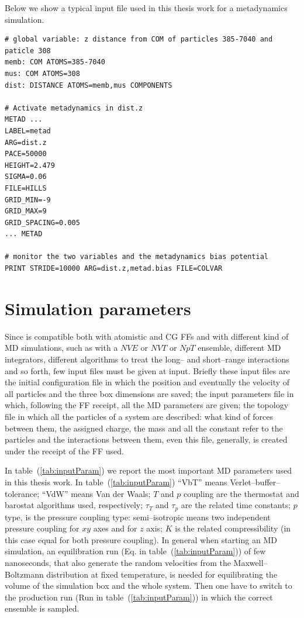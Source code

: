 Below we show a typical input file used in this thesis work for a metadynamics simulation.
\begin{Verbatim}[fontsize=\scriptsize,xleftmargin=1cm]
# global variable: z distance from COM of particles 385-7040 and paticle 308 
memb: COM ATOMS=385-7040
mus: COM ATOMS=308
dist: DISTANCE ATOMS=memb,mus COMPONENTS

# Activate metadynamics in dist.z
METAD ...
LABEL=metad
ARG=dist.z 
PACE=50000
HEIGHT=2.479
SIGMA=0.06
FILE=HILLS
GRID_MIN=-9
GRID_MAX=9
GRID_SPACING=0.005
... METAD

# monitor the two variables and the metadynamics bias potential
PRINT STRIDE=10000 ARG=dist.z,metad.bias FILE=COLVAR
\end{Verbatim}

\section{Simulation parameters}
Since \gromacs is compatible both with atomistic and \ac{CG} \acp{FF} and with different kind of \ac{MD} simulations, such as with a $NVE$ or $NVT$ or $NpT$ ensemble, different \ac{MD} integrators, different algorithms to treat the long-- and short--range interactions and so forth, few input files must be given at \gromacs input. Briefly these input files are the initial configuration file in which the position and eventually the velocity of all particles and the three box dimensions are saved; the input parameters file in which, following the \ac{FF} receipt, all the \ac{MD} parameters are given; the topology file in which all the particles of a system are described: what kind of forces between them, the assigned charge, the mass and all the constant refer to the particles and the interactions between them, even this file, generally, is created under the receipt of the \ac{FF} used.

In table~(\ref{tab:inputParam}) we report the most important \ac{MD} parameters used in this thesis work. In table~(\ref{tab:inputParam}) ``VbT'' means Verlet--buffer--tolerance; ``VdW'' means Van der Waals; $T$ and $p$ coupling are the thermostat and barostat algorithms used, respectively; $\tau_T$ and $\tau_p$ are the related time constants; $p$ type, is the pressure coupling type: semi--isotropic means two independent pressure coupling for $xy$ axes and for $z$ axis; $K$ is the related compressibility (in this case equal for both pressure coupling). In general when starting an \ac{MD} simulation, an equilibration run (Eq. in table~(\ref{tab:inputParam})) of few nanoseconds, that also generate the random velocities from the Maxwell–Boltzmann distribution at fixed temperature, is needed for equilibrating the volume of the simulation box and the whole system. Then one have to switch to the production run (Run in table~(\ref{tab:inputParam})) in which the correct ensemble is sampled. 

